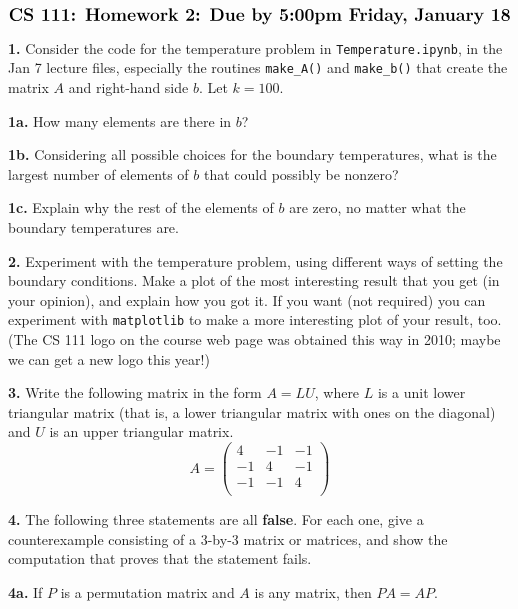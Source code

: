\documentclass[11pt]{article}
\begin{document}
$$\mbox{\Large \bf CS 111: Homework 2: Due by 5:00pm Friday, January 18}$$

\par\bigskip
{\bf 1.}
Consider the code for the temperature problem in
{\tt Temperature.ipynb}, in the Jan 7 lecture files,
especially the routines {\tt make\_A()} and {\tt make\_b()}
that create the matrix $A$ and right-hand side $b$.
Let $k=100$.

\par\medskip
{\bf 1a.}
How many elements are there in $b$?

\par\medskip
{\bf 1b.}
Considering all possible choices for the boundary temperatures,
what is the largest number of elements of $b$ that could possibly 
be nonzero? 

\par\medskip
{\bf 1c.}
Explain why the rest of the elements of $b$ are zero, no matter
what the boundary temperatures are.

\par\bigskip
{\bf 2.}
Experiment with the temperature problem, using different ways
of setting the boundary conditions. Make a plot of the most
interesting result that you get (in your opinion), and explain
how you got it. If you want (not required) you can experiment
with {\tt matplotlib} to make a more interesting plot of your
result, too. (The CS 111 logo on the course web page was obtained 
this way in 2010; maybe we can get a new logo this year!)

\par\bigskip
{\bf 3.}
Write the following matrix in the form $A=LU$, 
where $L$ is a unit lower triangular matrix
(that is, a lower triangular matrix with ones on the diagonal) 
and $U$ is an upper triangular matrix.
$$A =
   \left(
   \begin{array}{ccc}
    4 & -1 & -1 \\ 	
   -1 &  4 & -1 \\ 
   -1 & -1 &  4 \\
   \end{array} \right)
$$

\par\bigskip
{\bf 4.}
The following three statements are all {\bf false}. For each one, 
give a counterexample consisting of a 3-by-3 matrix or matrices, 
and show the computation that proves that the statement fails.

\par\medskip
{\bf 4a.}
If $P$ is a permutation matrix and $A$ is any matrix, then $PA=AP$.
\end{document}
